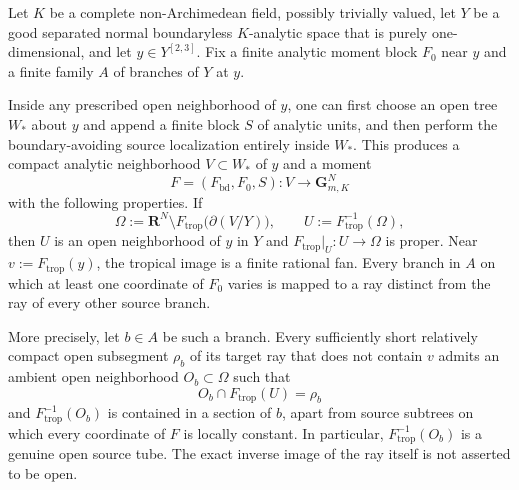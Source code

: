 
\begin{lemma}
\label{lem:p213-variation-graph-branch-separation}
Let $K$ be a complete non-Archimedean field, possibly trivially valued,
let $Y$ be a good separated normal boundaryless $K$-analytic space that is
purely one-dimensional, and let $y\in Y^{[2,3]}$.  Fix a finite analytic
moment block $F_0$ near $y$ and a finite family $A$ of branches of $Y$ at
$y$.

Inside any prescribed open neighborhood of $y$, one can first choose an
open tree $W_*$ about $y$ and append a finite block $S$ of analytic units,
and then perform the boundary-avoiding source localization entirely inside
$W_*$.  This produces a compact analytic neighborhood $V\subset W_*$ of
$y$ and a moment
\[
       F=(F_{\mathrm{bd}},F_0,S):V\longrightarrow
       \mathbf G_{m,K}^{N}
\]
with the following properties.  If
\begin{equation}
 \Omega:=\mathbf R^N\setminus
 F_{\mathrm{trop}}\bigl(\partial(V/Y)\bigr),
 \qquad
 U:=F_{\mathrm{trop}}^{-1}(\Omega),
 \label{eq:p213-variation-local-omega}
\end{equation}
then $U$ is an open neighborhood of $y$ in $Y$ and
$F_{\mathrm{trop}}|_U:U\to\Omega$ is proper.  Near
$v:=F_{\mathrm{trop}}(y)$, the tropical image is a finite rational fan.
Every branch in $A$ on which at least one coordinate of $F_0$ varies is
mapped to a ray distinct from the ray of every other source branch.

More precisely, let $b\in A$ be such a branch.  Every sufficiently short
relatively compact open subsegment $\rho_b$ of its target ray that does not
contain $v$ admits an ambient open neighborhood $O_b\subset\Omega$ such
that
\begin{equation}
 O_b\cap F_{\mathrm{trop}}(U)=\rho_b
 \label{eq:p213-variation-ambient-tube}
\end{equation}
and $F_{\mathrm{trop}}^{-1}(O_b)$ is contained in a section of $b$, apart
from source subtrees on which every coordinate of $F$ is locally constant.
In particular, $F_{\mathrm{trop}}^{-1}(O_b)$ is a genuine open source
tube.  The exact inverse image of the ray itself is not asserted to be
open.
\end{lemma}

